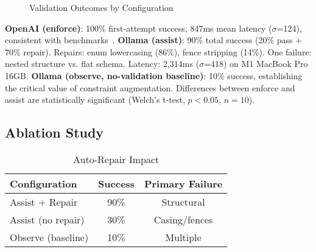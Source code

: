 \documentclass[sigconf]{acmart}
\begin{document}
\begin{figure}[H]
\centering
{}
\caption{Validation Outcomes by Configuration}
\label{fig:results}
\end{figure}

\textbf{OpenAI (enforce)}: 100\% first-attempt success, 847ms mean latency (\(\sigma\)=124), consistent with benchmarks~\cite{achiam2023gpt}. \textbf{Ollama (assist)}: 90\% total success (20\% pass + 70\% repair). Repairs: enum lowercasing (86\%), fence stripping (14\%). One failure: nested structure vs. flat schema. Latency: 2,314ms (\(\sigma\)=418) on M1 MacBook Pro 16GB. \textbf{Ollama (observe, no-validation baseline)}: 10\% success, establishing the critical value of constraint augmentation. Differences between enforce and assist are statistically significant (Welch's t-test, \(p < 0.05\), \(n = 10\)).

\subsection{Ablation Study}

\begin{table}[H]
\centering
\caption{Auto-Repair Impact}
\label{tab:ablation}
\scriptsize
\begin{tabular}{@{}lcc@{}}
\toprule
\textbf{Configuration} & \textbf{Success} & \textbf{Primary Failure} \\
\midrule
Assist + Repair & 90\% & Structural \\
Assist (no repair) & 30\% & Casing/fences \\
Observe (baseline) & 10\% & Multiple \\
\bottomrule
\end{tabular}
\end{table}
\end{document}
